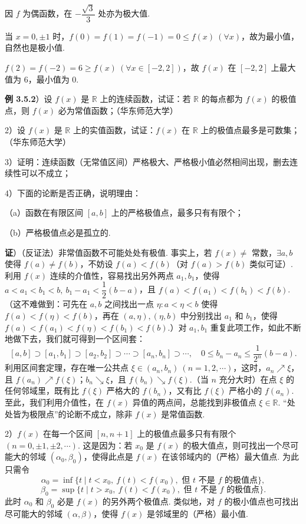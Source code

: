 \documentclass[UTF8,12pt,a4paper,fontset=fandol]{ctexart}
\begin{document}
因 $f$ 为偶函数，在 $-\dfrac{\sqrt3}{3}$ 处亦为极大值.

当 $x=0,\pm1$ 时，$f(0)=f(1)=f(-1)=0\le f(x)\ (\forall x)$，故为最小值，自然也是极小值.

$f(2)=f(-2)=6\ge f(x)\ (\forall x\in[-2,2])$，故 $f(x)$ 在 $[-2,2]$ 上最大值为 6，最小值为 0.

\noindent\textbf{例 3.5.2}）设 $f(x)$ 是 $\mathbb R$ 上的连续函数，试证：若 $\mathbb R$ 的每点都为 $f(x)$ 的极值点，则 $f(x)$ 必为常值函数；（华东师范大学）

2）设 $f(x)$ 是 $\mathbb R$ 上的实值函数，试证：$f(x)$ 在 $\mathbb R$ 上的极值点最多是可数集；（华东师范大学）

3）证明：连续函数（无常值区间）严格极大、严格极小值必然相间出现，删去连续性可以不成立；

4）下面的论断是否正确，说明理由：

（a）函数在有限区间 $[a,b]$ 上的严格极值点，最多只有有限个；

（b）严格极值点必是孤立的.

\noindent\textbf{证}）（反证法）非常值函数不可能处处有极值. 事实上，若 $f(x)\ne$ 常数，$\exists a,b$ 使得 $f(a)\ne f(b)$，不妨设 $f(a)<f(b)$（对 $f(a)>f(b)$ 类似可证）. 利用 $f(x)$ 连续的介值性，容易找出另外两点 $a_1,b_1$，使得 $a<a_1<b_1<b,\ b_1-a_1<\dfrac12(b-a)$，且 $f(a)<f(a_1)<f(b_1)<f(b)$.（这不难做到：可先在 $a,b$ 之间找出一点 $\eta:a<\eta<b$ 使得 $f(a)<f(\eta)<f(b)$，再在 $(a,\eta),(\eta,b)$ 中分别找出 $a_1$ 和 $b_1$，使得 $f(a)<f(a_1)<f(\eta)<f(b_1)<f(b)$.）对 $a_1,b_1$ 重复此项工作，如此不断地做下去，我们就可得到一个区间套：
\[
  [a,b]\supset[a_1,b_1]\supset[a_2,b_2]\supset\cdots\supset[a_n,b_n]\supset\cdots,\quad
  0\le b_n-a_n\le\frac1{2^n}(b-a).
\]
利用区间套定理，存在唯一公共点 $\xi\in(a_n,b_n)\ (n=1,2,\cdots)$，这时，$a_n\nearrow\xi$，且 $f(a_n)\nearrow f(\xi)$；$b_n\searrow\xi$，且 $f(b_n)\searrow f(\xi)$.（当 $n$ 充分大时）在点 $\xi$ 的任何邻域里，既有比 $f(\xi)$ 严格大的 $f(b_n)$，又有比 $f(\xi)$ 严格小的 $f(a_n)$. 至此，我们利用介值性，在 $f(x)$ 异值的两点间，总能找到非极值点 $\xi\in\mathbb R$. “处处皆为极限点”的论断不成立，除非 $f(x)$ 是常值函数.

2）$f(x)$ 在每一个区间 $[n,n+1]$ 上的极值点最多只有有限个 $(n=0,\pm1,\pm2,\cdots)$. 这是因为：若 $x_0$ 是 $f(x)$ 的极大值点，则可找出一个尽可能大的邻域 $(\alpha_0,\beta_0)$，使得此点是 $f(x)$ 在该邻域内的（严格）最大值点. 为此只需令
\[
  \alpha_0=\inf\{t\mid t<x_0,\ f(t)<f(x_0),\text{ 但 }t\text{ 不是 }f\text{ 的极值点}\},
\]
\[
  \beta_0=\sup\{t\mid t>x_0,\ f(t)<f(x_0),\text{ 但 }t\text{ 不是 }f\text{ 的极值点}\}.
\]
此时 $\alpha_0$ 和 $\beta_0$ 必是 $f(x)$ 的另外两个极值点. 类似地，对 $f$ 的极小值点也可找出尽可能大的邻域 $(\alpha,\beta)$，使得 $f(x)$ 是邻域里的（严格）最小值.
\end{document}
